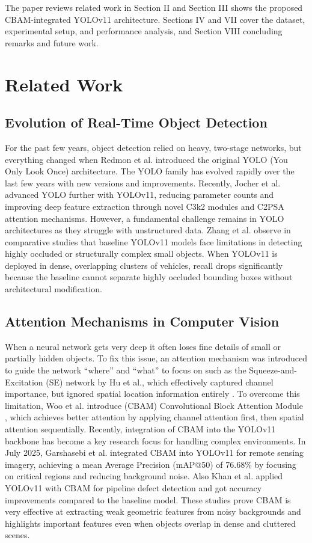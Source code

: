 \documentclass[sigconf]{acmart}
\begin{document}
The paper reviews related work in Section II and Section III shows the proposed CBAM-integrated YOLOv11 architecture. Sections IV and VII cover the dataset, experimental setup, and performance analysis, and  Section VIII concluding remarks and future work.

\section{Related Work}

\subsection{Evolution of Real-Time Object Detection}

For the past few years, object detection relied on heavy, two-stage networks, but everything changed when Redmon et al. introduced the original YOLO (You Only Look Once) architecture\cite{redmon2016you}. The YOLO family has evolved rapidly over the last few years with new versions and improvements. Recently, Jocher et al. advanced YOLO further with YOLOv11, reducing parameter counts\cite{Jocher2025YOLOv11} and improving deep feature extraction through novel C3k2 modules and C2PSA attention mechanisms\cite{9a}. However, a fundamental challenge remains in YOLO architectures as they struggle with unstructured data. Zhang et al. observe in comparative studies that baseline YOLOv11 models face limitations in detecting highly occluded or structurally complex small objects\cite{zhang2025trinext}. When YOLOv11 is deployed in dense, overlapping clusters of vehicles, recall drops significantly because the baseline cannot separate highly occluded bounding boxes without architectural modification.

\subsection{Attention Mechanisms in Computer Vision}
When a neural network gets very deep it often loses fine details of small or partially hidden objects. To fix this issue, an attention mechanism was introduced to guide the network “where” and “what” to focus on such as the Squeeze-and-Excitation (SE) network by Hu et al., which effectively captured channel importance, but ignored spatial location information entirely \cite{11a}. To overcome this limitation, Woo et al. introduce (CBAM) Convolutional Block Attention Module \cite{Woo2018CBAM}, which achieves better attention by applying channel attention first, then spatial attention sequentially. Recently, integration of CBAM into the YOLOv11 backbone has become a key research focus for handling complex environments. In July 2025, Garshasebi et al.\cite{garshasebi2025improving} integrated CBAM into YOLOv11 for remote sensing imagery, achieving a mean Average Precision (mAP@50) of 76.68\% by focusing on critical regions and reducing background noise. Also Khan et al. applied YOLOv11 with CBAM for pipeline defect detection and got accuracy improvements compared to the baseline model\cite{khan2025pipeline}. These studies prove CBAM is very effective at extracting weak geometric features from noisy backgrounds and highlights important features even when objects overlap in dense and cluttered scenes.
\end{document}
